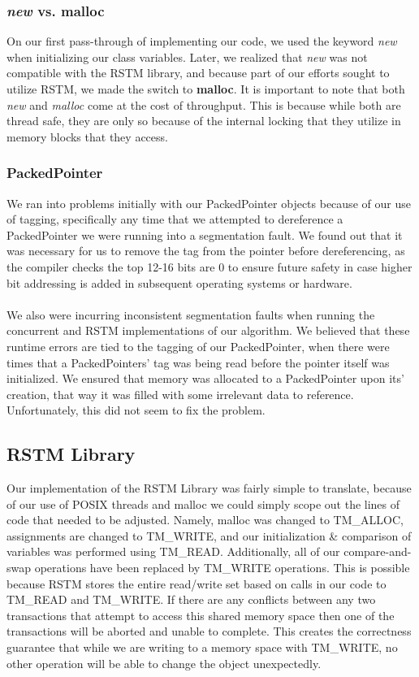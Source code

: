 \documentclass[letterpaper, 10 pt, conference]{ieeeconf}
\begin{document}
\subsubsection{\textit{new} vs. malloc}
On our first pass-through of implementing our code, we used the keyword \textit{new} when initializing our class variables. Later, we realized that \textit{new} was not compatible with the RSTM library, and because part of our efforts sought to utilize RSTM, we made the switch to \textbf{malloc}. It is important to note that both \textit{new} and \textit{malloc} come at the cost of throughput. This is because while both are thread safe, they are only so because of the internal locking that they utilize in memory blocks that they access.

\subsubsection{PackedPointer}
We ran into problems initially with our PackedPointer objects because of our use of tagging, specifically any time that we attempted to dereference a PackedPointer we were running into a segmentation fault. We found out that it was necessary for us to remove the tag from the pointer before dereferencing, as the compiler checks the top 12-16 bits are 0 to ensure future safety in case higher bit addressing is added in subsequent operating systems or hardware. \\ \\
We also were incurring inconsistent segmentation faults when running the concurrent and RSTM implementations of our algorithm. We believed that these runtime errors are tied to the tagging of our PackedPointer, when there were times that a PackedPointers' tag was being read before the pointer itself was initialized. We ensured that memory was allocated to a PackedPointer upon its' creation, that way it was filled with some irrelevant data to reference. Unfortunately, this did not seem to fix the problem. 

\subsection{RSTM Library}
Our implementation of the RSTM Library was fairly simple to translate, because of our use of POSIX threads and malloc we could simply scope out the lines of code that needed to be adjusted. Namely, malloc was changed to TM\_ALLOC, assignments are changed to TM\_WRITE, and our initialization \& comparison of variables was performed using TM\_READ. Additionally, all of our compare-and-swap operations have been replaced by TM\_WRITE operations. This is possible because RSTM stores the entire read/write set based on calls in our code to TM\_READ and TM\_WRITE. If there are any conflicts between any two transactions that attempt to access this shared memory space then one of the transactions will be aborted and unable to complete. This creates the correctness guarantee that while we are writing to a memory space with TM\_WRITE, no other operation will be able to change the object unexpectedly.
\end{document}
